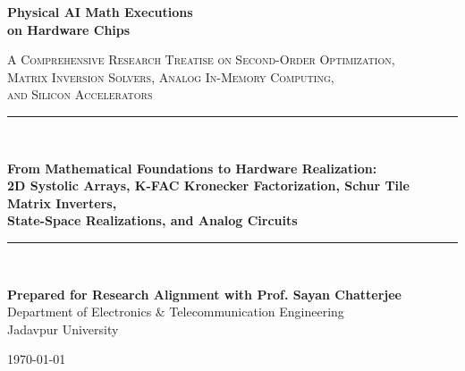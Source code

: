 \documentclass[11pt,a4paper,oneside]{book}
\begin{document}
\begin{titlepage}
    \centering
    \vspace*{1.0cm}
    
    {\Huge \bfseries \sffamily \color{navyblue} Physical AI Math Executions \\ on Hardware Chips \par}
    \vspace{0.6cm}
    {\Large \scshape A Comprehensive Research Treatise on Second-Order Optimization, \\ Matrix Inversion Solvers, Analog In-Memory Computing, \\ and Silicon Accelerators \par}
    \vspace{1.0cm}
    
    \rule{\linewidth}{1.5pt} \\[0.4cm]
    {\large \bfseries From Mathematical Foundations to Hardware Realization: \\ 2D Systolic Arrays, K-FAC Kronecker Factorization, Schur Tile Matrix Inverters, \\ State-Space Realizations, and Analog Circuits \par}
    \rule{\linewidth}{1.5pt} \\[1.2cm]
    
    \vfill
    
    \begin{tcolorbox}[colback=white,colframe=navyblue,arc=5pt,boxrule=1pt,width=0.88\linewidth]
        \centering
        \vspace{3pt}
        {\large \textbf{Prepared for Research Alignment with Prof. Sayan Chatterjee}} \\[3pt]
        {\small Department of Electronics \& Telecommunication Engineering} \\[2pt]
        {\small Jadavpur University}
        \vspace{3pt}
    \end{tcolorbox}
    
    \vspace{0.8cm}
    {\large \today \par}
\end{titlepage}

\frontmatter

\end{document}
